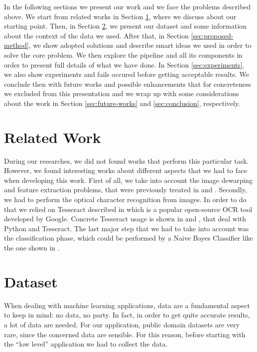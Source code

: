\documentclass[10pt,twocolumn,letterpaper]{article}
\begin{document}
In the following sections we present our work and we face the problems
described above. We start from related works in Section
\ref{sec:related-work}, where we discuss about our starting
point. Then, in Section \ref{sec:dataset}, we present our dataset and
some information about the context of the data we used. After that, in
Section \ref{sec:proposed-method}, we show adopted solutions and
describe smart ideas we used in order to solve the core problem. We
then explore the pipeline and all its components in order to present
full details of what we have done. In Section \ref{sec:experiments},
we also show experiments and fails occured before getting acceptable
results. We conclude then with future works and possible enhancements
that for concreteness we excluded from this presentation and we wrap
up with some considerations about the work in Section
\ref{sec:future-works} and \ref{sec:conclusion}, respectively.

\section{Related Work}
\label{sec:related-work}

During our researches, we did not found works that perform this
particular task. However, we found interesting works about different
aspects that we had to face when developing this work.  First of all, we
take into account the image dewarping and feature extraction problems,
that were previously treated in \cite{Korber18} and \cite{AbbasHussain17}.
Secondly, we had to perform the optical character recognition from
images. In order to do that we relied on Tesseract described in
\cite{Smith07} which is a popular open-source OCR tool developed by
Google. Concrete Tesseract usage is shown in \cite{Benabderrazak20}
and \cite{ZelicSable20}, that deal with Python and Tesseract. The
last major step that we had to take into account was the
classification phase, which could be performed by a Naive Bayes
Classifier like the one shown in \cite{ScikitTextDataTutorial}.

\section{Dataset}
\label{sec:dataset}

When dealing with machine learning applications, data are a
fundamental aspect to keep in mind: no data, no party. In fact, in
order to get quite accurate results, a lot of data are needed. For our
application, public domain datasets are very rare, since the concerned data are sensible. For this reason, before
starting with the ``low level'' application we had to collect the
data.
\end{document}
